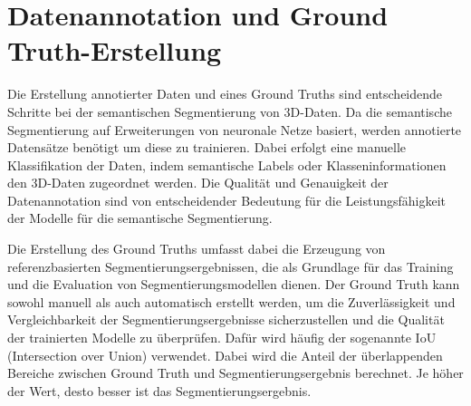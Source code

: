 \section{Datenannotation und Ground Truth-Erstellung}

Die Erstellung annotierter Daten und eines Ground Truths sind entscheidende
Schritte bei der semantischen Segmentierung von 3D-Daten. Da die semantische
Segmentierung auf Erweiterungen von neuronale Netze basiert, werden annotierte
Datensätze benötigt um diese zu trainieren. Dabei erfolgt eine manuelle
Klassifikation der Daten, indem semantische Labels oder Klasseninformationen
den 3D-Daten zugeordnet werden. Die Qualität und Genauigkeit der
Datenannotation sind von entscheidender Bedeutung für die Leistungsfähigkeit
der Modelle für die semantische Segmentierung.

Die Erstellung des Ground Truths umfasst dabei die Erzeugung von
referenzbasierten Segmentierungsergebnissen, die als Grundlage für das Training
und die Evaluation von Segmentierungsmodellen dienen. Der Ground Truth kann
sowohl manuell als auch automatisch erstellt werden, um die Zuverlässigkeit und
Vergleichbarkeit der Segmentierungsergebnisse sicherzustellen und die Qualität
der trainierten Modelle zu überprüfen. Dafür wird häufig der sogenannte IoU
(Intersection over Union) verwendet. Dabei wird die Anteil der überlappenden
Bereiche zwischen Ground Truth und Segmentierungsergebnis berechnet. Je höher
der Wert, desto besser ist das Segmentierungsergebnis.

